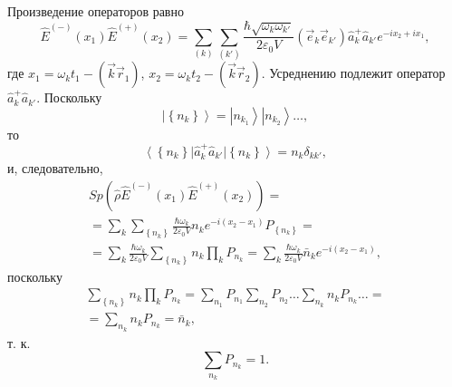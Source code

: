 Произведение операторов равно
\begin{equation}
\hat{E}^{(-)}\left(x_1\right)
\hat{E}^{(+)}\left(x_2\right) = \sum_{(k)}\sum_{(k')}
\frac{\hbar \sqrt{\omega_k \omega_{k'}}}{2 \varepsilon_0 V}
\left(\vec{e}_k\vec{e}_{k'}\right)
\hat{a}_k^{+}\hat{a}_{k'}
e^{-i x_2 + i x_1},
\label{eqCh4_21}
\end{equation}
где  $x_1 = \omega_k t_1 - \left(\vec{k}\vec{r}_1\right)$,
$x_2 = \omega_k t_2 - \left(\vec{k}\vec{r}_2\right)$.
Усреднению подлежит оператор $\hat{a}_k^{+}\hat{a}_{k'}$. Поскольку
\[\left|\left\{n_{k}\right\}\right> = 
\left|n_{k_1}\right>
\left|n_{k_2}\right> \dots,
\] 
то 
\[
\left<\left\{n_{k}\right\}\right|
\hat{a}_k^{+}\hat{a}_{k'}
\left|\left\{n_{k}\right\}\right> = 
n_k \delta_{kk'},
\]
и, следовательно, 
\begin{eqnarray}
Sp \left(
\hat{\rho}\hat{E}^{(-)}\left(x_1\right)
\hat{E}^{(+)}\left(x_2\right)
\right) = 
\nonumber \\
=\sum_{k}\sum_{\left\{n_{k}\right\}}
\frac{\hbar \omega_k}{2 \varepsilon_0 V} n_k e^{-i \left(x_2 - x_1
  \right)} 
P_{\left\{n_k\right\}} =
\nonumber \\
= \sum_{k}
\frac{\hbar \omega_k}{2 \varepsilon_0 V}
\sum_{\left\{n_{k}\right\}} n_k
\prod_k P_{n_k} =
\sum_{k} 
\frac{\hbar \omega_k}{2 \varepsilon_0 V}
\bar{n}_k e^{-i \left(x_2 - x_1\right)},
\nonumber
\end{eqnarray}
поскольку
\begin{eqnarray}
\sum_{\left\{n_{k}\right\}} n_k
\prod_kP_{n_k} = 
\sum_{n_1}P_{n_1} 
\sum_{n_2}P_{n_2}
\dots
\sum_{n_k}n_kP_{n_k}
\dots = 
\nonumber \\
=   \sum_{n_k}n_kP_{n_k} = \bar{n}_k,
\nonumber
\end{eqnarray}
т. к.
\[
\sum_{n_k}P_{n_k} = 1.
\]

